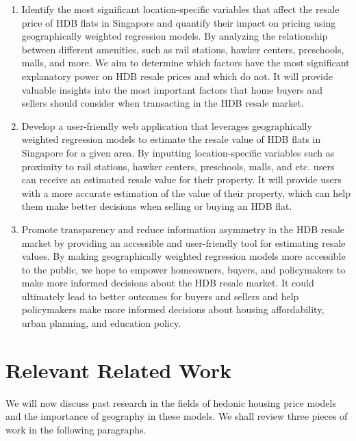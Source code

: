 \documentclass[manuscript,screen]{acmart}
\begin{document}
\begin{enumerate}
\def\labelenumi{\arabic{enumi}.}
\item
  Identify the most significant location-specific variables that affect
  the resale price of HDB flats in Singapore and quantify their impact
  on pricing using geographically weighted regression models. By
  analyzing the relationship between different amenities, such as rail
  stations, hawker centers, preschools, malls, and more. We aim to
  determine which factors have the most significant explanatory power on
  HDB resale prices and which do not. It will provide valuable insights
  into the most important factors that home buyers and sellers should
  consider when transacting in the HDB resale market.
\item
  Develop a user-friendly web application that leverages geographically
  weighted regression models to estimate the resale value of HDB flats
  in Singapore for a given area. By inputting location-specific
  variables such as proximity to rail stations, hawker centers,
  preschools, malls, and etc. users can receive an estimated resale
  value for their property. It will provide users with a more accurate
  estimation of the value of their property, which can help them make
  better decisions when selling or buying an HDB flat.
\item
  Promote transparency and reduce information asymmetry in the HDB
  resale market by providing an accessible and user-friendly tool for
  estimating resale values. By making geographically weighted regression
  models more accessible to the public, we hope to empower homeowners,
  buyers, and policymakers to make more informed decisions about the HDB
  resale market. It could ultimately lead to better outcomes for buyers
  and sellers and help policymakers make more informed decisions about
  housing affordability, urban planning, and education policy.
\end{enumerate}

\hypertarget{relevant-related-work}{%
\section{Relevant Related Work}\label{relevant-related-work}}

We will now discuss past research in the fields of hedonic housing price
models and the importance of geography in these models. We shall review
three pieces of work in the following paragraphs.
\end{document}
